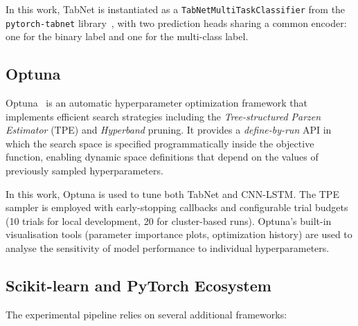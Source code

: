 \documentclass[../main.tex]{subfiles}
\begin{document}
In this work, TabNet is instantiated as a \texttt{TabNetMultiTaskClassifier}
from the \texttt{pytorch-tabnet} library~\supercite{dreamquark2020tabnet}, with two
prediction heads sharing a common encoder: one for the binary label and one for the multi-class label.


\subsection{Optuna}
\label{sec:tech-optuna}

Optuna~\supercite{akiba2019optuna} is an automatic hyperparameter optimization
framework that implements efficient search strategies including the
\emph{Tree-structured Parzen Estimator} (TPE) and \emph{Hyperband} pruning.
It provides a \emph{define-by-run} API in which the search space is specified
programmatically inside the objective function, enabling dynamic space
definitions that depend on the values of previously sampled hyperparameters.

In this work, Optuna is used to tune both TabNet and CNN-LSTM.  The TPE sampler is
employed with early-stopping callbacks and configurable trial budgets (10
trials for local development, 20 for cluster-based runs).  Optuna's built-in
visualisation tools (parameter importance plots, optimization history) are used
to analyse the sensitivity of model performance to individual hyperparameters.

\subsection{Scikit-learn and PyTorch Ecosystem}
\label{sec:tech-sklearn-pytorch}

The experimental pipeline relies on several additional frameworks:
\end{document}
